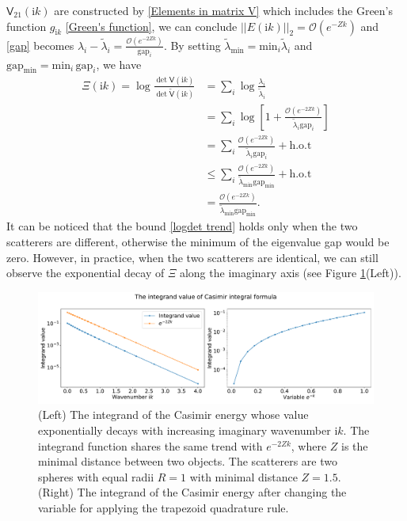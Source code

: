 $\mathsf{V}_{21}(\mathrm{i}k)$ are constructed by \eqref{Elements in matrix V} which includes the 
Green's function $g_{\mathrm{i}k}$ \eqref{Green's function}, we can conclude $||E(\mathrm{i}k)||_{2} = \mathcal{O}(e^{-Zk})$ and \eqref{gap} becomes 
$\lambda_{i} - \tilde{\lambda}_{i} = \frac{\mathcal{O}(e^{-2Zk})}{\text{gap}_{i}}$.
By setting $\tilde{\lambda}_{\text{min}} = \text{min}_{i}\tilde{\lambda}_{i}$ and $\text{gap}_{\text{min}} = \text{min}_{i}\,\text{gap}_{i}$, we have 
    \begin{align}\label{logdet trend}
        \Xi(\mathrm{i}k) = \log\frac{\det\mathsf{V}(\mathrm{i}k)}{\det\tilde{\mathsf{V}}(\mathrm{i}k)} 
        &= \sum_{i}\log\frac{\lambda_{i}}{\tilde{\lambda}_{i}}\nonumber\\
        &= \sum_{i}\log\left[1+\frac{\mathcal{O}(e^{-2Zk})}{\tilde{\lambda}_{i}\text{gap}_{i}}\right]\nonumber\\
        &= \sum_{i} \frac{\mathcal{O}(e^{-2Zk})}{\tilde{\lambda}_{i}\text{gap}_{i}} + \text{h.o.t}\nonumber\\
        &\leq \sum_{i}\frac{\mathcal{O}(e^{-2Zk})}{\tilde{\lambda}_{\text{min}}\text{gap}_{\text{min}}} + \text{h.o.t}\nonumber\\
        &= \frac{\mathcal{O}(e^{-2Zk})}{\tilde{\lambda}_{\text{min}}\text{gap}_{\text{min}}}. 
    \end{align}
It can be noticed that the bound \eqref{logdet trend} holds only when the two scatterers are different, otherwise the minimum of the eigenvalue gap would be zero. 
However, in practice, when the two scatterers are identical, we can still observe the exponential decay of $\Xi$ along the imaginary 
axis (see Figure \ref{The integrand decays exponentially}(Left)).

\begin{figure}[H]
    \centering
    \hspace*{-1cm}\includegraphics[scale = 0.4]{figures/integ_exp_decay.pdf}
    \caption{(Left) The integrand of the Casimir energy whose value exponentially decays with increasing imaginary wavenumber $\mathrm{i}k$. The integrand function 
    shares the same trend with $e^{-2Zk}$, where $Z$ is the minimal distance between two objects. The scatterers are two spheres with equal radii 
    $R = 1$ with minimal distance $Z = 1.5$. (Right) The integrand of the Casimir energy after changing the 
    variable for applying the trapezoid quadrature rule.}
    \label{The integrand decays exponentially}
\end{figure}

